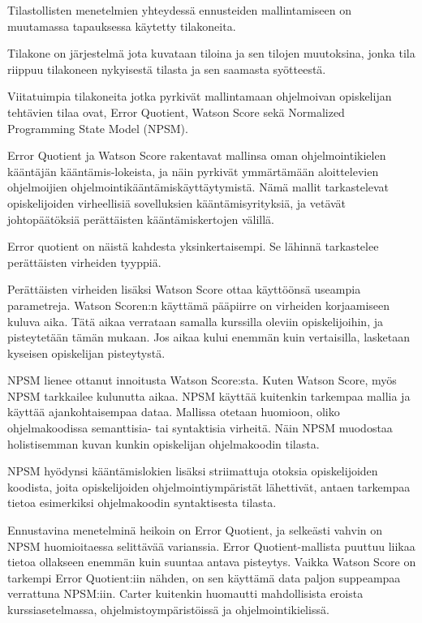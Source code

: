 \documentclass[finnish,twoside,openright]{HYgraduMLDS}
\begin{document}
Tilastollisten menetelmien yhteydessä ennusteiden mallintamiseen on muutamassa tapauksessa käytetty tilakoneita. 

Tilakone on järjestelmä jota kuvataan tiloina ja sen tilojen muutoksina, jonka tila riippuu tilakoneen nykyisestä tilasta ja sen saamasta syötteestä. 

Viitatuimpia tilakoneita jotka pyrkivät mallintamaan ohjelmoivan opiskelijan tehtävien tilaa ovat, Error Quotient\cite{jadud2006methods}, Watson Score\cite{watson2013predicting} sekä Normalized Programming State Model (NPSM)\cite{carter2015normalized}. 

Error Quotient ja Watson Score rakentavat mallinsa oman ohjelmointikielen kääntäjän kääntämis-lokeista, ja näin pyrkivät ymmärtämään aloittelevien ohjelmoijien ohjelmointikääntämiskäyttäytymistä. Nämä mallit tarkastelevat opiskelijoiden virheellisiä sovelluksien kääntämisyrityksiä, ja vetävät johtopäätöksiä perättäisten kääntämiskertojen välillä. 

Error quotient on näistä kahdesta yksinkertaisempi. Se lähinnä tarkastelee perättäisten virheiden tyyppiä. 

Perättäisten virheiden lisäksi Watson Score ottaa käyttöönsä useampia parametreja. Watson Scoren:n käyttämä pääpiirre on virheiden korjaamiseen kuluva aika. Tätä aikaa verrataan samalla kurssilla oleviin opiskelijoihin, ja pisteytetään tämän mukaan. Jos aikaa kului enemmän kuin vertaisilla, lasketaan kyseisen opiskelijan pisteytystä.

NPSM lienee ottanut innoitusta Watson Score:sta. Kuten Watson Score, myös NPSM tarkkailee kulunutta aikaa. NPSM käyttää kuitenkin tarkempaa mallia ja käyttää ajankohtaisempaa dataa. Mallissa otetaan huomioon, oliko ohjelmakoodissa semanttisia- tai syntaktisia virheitä. Näin NPSM muodostaa holistisemman kuvan kunkin opiskelijan ohjelmakoodin tilasta. 

NPSM hyödynsi kääntämislokien lisäksi striimattuja otoksia opiskelijoiden koodista, joita opiskelijoiden ohjelmointiympäristät lähettivät, antaen tarkempaa tietoa esimerkiksi ohjelmakoodin syntaktisesta tilasta. 

Ennustavina menetelminä heikoin on Error Quotient, ja selkeästi vahvin on NPSM huomioitaessa selittävää varianssia\cite{carter2015normalized}. Error Quotient-mallista puuttuu liikaa tietoa ollakseen enemmän kuin suuntaa antava pisteytys\cite{jadud2006methods}. Vaikka Watson Score on tarkempi Error Quotient:iin nähden, on sen käyttämä data paljon suppeampaa verrattuna NPSM:iin\cite{carter2015normalized}. Carter kuitenkin huomautti mahdollisista eroista kurssiasetelmassa, ohjelmistoympäristöissä ja ohjelmointikielissä\cite{carter2015normalized}. 
\end{document}
